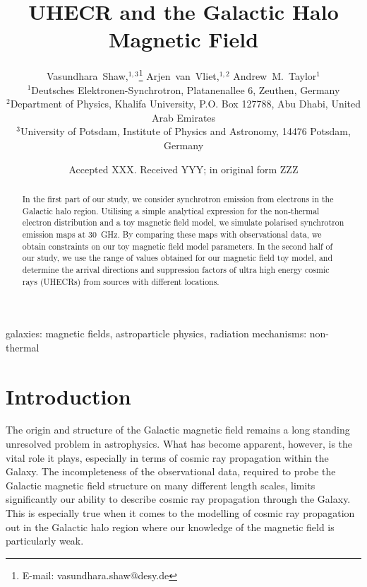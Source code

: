 \documentclass[usenatbib]{mnras}
\title{UHECR and the Galactic Halo Magnetic Field}
\author[V.~Shaw et al.]{
Vasundhara~Shaw,$^{1,3}$\thanks{E-mail: vasundhara.shaw@desy.de}
Arjen~van~Vliet,$^{1,2}$
Andrew~M.~Taylor$^{1}$
\\
$^{1}$Deutsches Elektronen-Synchrotron, Platanenallee 6, Zeuthen, Germany \\ %
$^{2}$Department of Physics, Khalifa University, P.O. Box 127788, Abu Dhabi, United Arab Emirates \\
$^{3}$University of Potsdam, Institute of Physics and Astronomy, 14476 Potsdam, Germany
}
\date{Accepted XXX. Received YYY; in original form ZZZ}
\begin{document}
\maketitle

\begin{abstract}
In the first part of our study, we consider synchrotron emission from electrons in the Galactic halo region. Utilising a simple analytical expression for the non-thermal electron distribution and a toy magnetic field model, we simulate polarised synchrotron emission maps at 30~GHz. By comparing these maps with observational data, we obtain constraints on our toy magnetic field model parameters. In the second half of our study, we use the range of values obtained for our magnetic field toy model, and determine the arrival directions and suppression factors of ultra high energy cosmic rays (UHECRs) from sources with different locations.
\end{abstract}

\begin{keywords}
galaxies: magnetic fields, astroparticle physics, radiation mechanisms: non-thermal
\end{keywords}


\section{Introduction}
\label{Introducion}

The origin and structure of the Galactic magnetic field remains a long standing unresolved problem in astrophysics. What has become apparent, however, is the vital role it plays, especially in terms of cosmic ray propagation within the Galaxy. The incompleteness of the observational data, required to probe the Galactic magnetic field structure on many different length scales, limits significantly our ability to describe cosmic ray propagation through the Galaxy. This is especially true when it comes to the modelling of cosmic ray propagation out in the Galactic halo region where our knowledge of the magnetic field is particularly weak.
\end{document}
